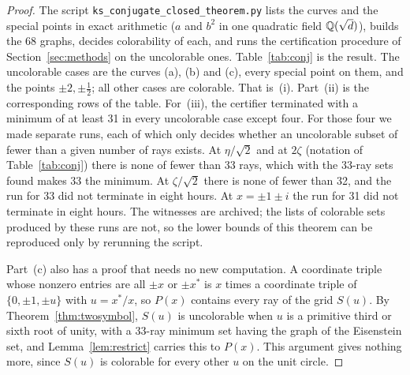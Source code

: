 \begin{proof}
The script \texttt{ks\_conjugate\_closed\_theorem.py} lists the curves and the special points in
exact arithmetic ($a$ and $b^2$ in one quadratic field $\mathbb{Q}(\sqrt d)$), builds the 68 graphs, decides colorability of
each, and runs the certification procedure of Section~\ref{sec:methods} on the uncolorable ones.
Table~\ref{tab:conj} is the result.  The uncolorable cases are the curves (a), (b) and (c), every
special point on them, and the points $\pm2,\pm\tfrac12$; all other cases are colorable.  That
is~(i).  Part~(ii) is the corresponding rows of the table.  For~(iii), the certifier terminated
with a minimum of at least 31 in every uncolorable case except four.  For those four we made
separate runs, each of which only decides whether an uncolorable subset of fewer than a given
number of rays exists.  At $\eta/\sqrt2$ and at $2\zeta$
(notation of Table~\ref{tab:conj}) there is none of fewer than 33 rays,
which with the 33-ray sets found makes 33 the minimum.  At $\zeta/\sqrt2$ there is none of
fewer than 32, and the run for 33 did not terminate in eight hours.  At $x=\pm1\pm i$ the run
for 31 did not terminate in eight hours.  The
witnesses are archived; the lists of colorable sets produced by these runs are not, so the
lower bounds of this theorem can be reproduced only by rerunning the script.

Part~(c) also has a proof that needs no new computation.  A coordinate triple whose nonzero entries are all
$\pm x$ or $\pm x^{*}$ is $x$ times a coordinate triple of $\{0,\pm1,\pm u\}$ with $u=x^{*}/x$, so $P(x)$
contains every ray of the grid $S(u)$.  By Theorem~\ref{thm:twosymbol}, $S(u)$ is
uncolorable when $u$ is a primitive third or sixth root of unity, with a 33-ray minimum set
having the graph of the Eisenstein set, and Lemma~\ref{lem:restrict} carries this to $P(x)$.
This argument gives nothing more, since $S(u)$ is colorable for every other $u$ on the unit
circle.
\end{proof}

